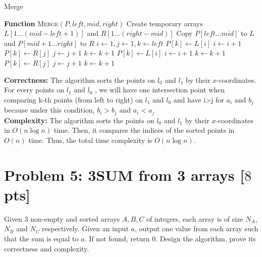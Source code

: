 \documentclass[letterpaper, 11pt]{article}
\newcommand{\1}{\mathds{1}}	%
\theoremstyle{definition}
\newcommand{\problem}[1]{\section*{Problem #1}}
\newenvironment{solution}{{\par\noindent\it Solution.}}{}
\begin{document}
\begin{solution}
    \begin{algorithm}[H]
    \caption{Merge}
    \begin{algorithmic}[1]
    \STATE \textbf{Function} \textsc{Merge}$(P, left, mid, right)$
    \STATE Create temporary arrays $L[1...(mid-left+1)]$ and $R[1...(right-mid)]$
    \STATE Copy $P[left...mid]$ to $L$ and $P[mid+1...right]$ to $R$
    \STATE $i \gets 1, j \gets 1, k \gets left$
    \STATE $P[k] \gets L[i]$
    \STATE $i \gets i + 1$
    \ELSE
    \STATE $P[k] \gets R[j]$
    \STATE $j \gets j + 1$
    \ENDIF
    \STATE $k \gets k + 1$
    \ENDWHILE
    \STATE $P[k] \gets L[i]$
    \STATE $i \gets i + 1$
    \STATE $k \gets k + 1$
    \ENDWHILE
    \STATE $P[k] \gets R[j]$
    \STATE $j \gets j + 1$
    \STATE $k \gets k + 1$
    \ENDWHILE
    \end{algorithmic}
    \end{algorithm}
\textbf{Correctness:} The algorithm sorts the points on $l_0$ and $l_1$ by their $x$-coordinates. For every points on $ l_1 \text{ and } l_0 $ , we will have one intersection point when comparing k-th points (from left to right) on $ l_1 \text{ and } l_0 $ and have i>j for $ a_i \text{ and } b_j $ because under this condition, $b_i>b_j \text{ and } a_i<a_j   $ 
\\\textbf{Complexity:} The algorithm sorts the points on $l_0$ and $l_1$ by their $x$-coordinates in $O(n\log n)$ time. Then, it compares the indices of the sorted points in $O(n)$ time. Thus, the total time complexity is $O(n\log n)$.
\end{solution}


\problem{5: 3SUM from 3 arrays [$8$ pts]}
Given 3 non-empty and sorted arrays $A, B, C$ of integers, each array is of size $N_A$, $N_B$ and $N_C$ respectively. Given an input $a$, output one value from each array such that the sum is equal to $a$. If not found, return $0$. Design the algorithm, prove its correctness and complexity.
\end{document}
